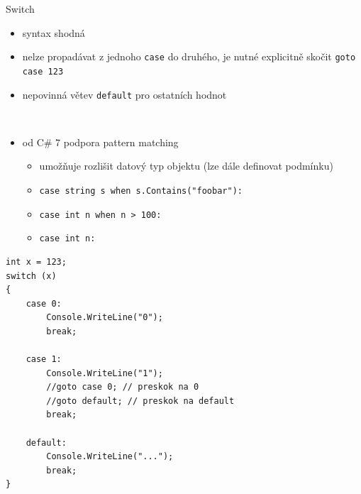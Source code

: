 \begin{frame}[fragile]
\vfill
\begin{block}{Switch}
\begin{itemize}
\item syntax shodná
\item nelze propadávat z jednoho \lstinline|case| do druhého, je nutné explicitně skočit \lstinline|goto case 123|
\item nepovinná větev \lstinline|default| pro ostatních hodnot
\end{itemize}
\end{block}
\vfill
\begin{bonusblock}{~}
\begin{itemize}
\item od C\# 7 podpora pattern matching
\begin{itemize}
\item umožňuje rozlišit datový typ objektu (lze dále definovat podmínku)
\item \lstinline|case string s when s.Contains("foobar"):|
\item \lstinline|case int n when n > 100:|
\item \lstinline|case int n:|
\end{itemize}
\end{itemize}
\end{bonusblock}
\vfill
\end{frame}





\begin{frame}[fragile]
\begin{yesblock}
\begin{lstlisting}
int x = 123;
switch (x)
{
    case 0: 
        Console.WriteLine("0");
        break;

    case 1:
        Console.WriteLine("1");
        //goto case 0; // preskok na 0
        //goto default; // preskok na default
        break;

    default:
        Console.WriteLine("...");
        break;
}
\end{lstlisting}
\end{yesblock}
\end{frame}





